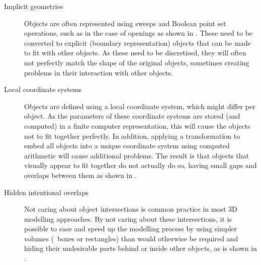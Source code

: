 \begin{description}

\item[Implicit geometries] Objects are often represented using sweeps and Boolean point set operations, such as in the case of openings as shown in .
These need to be converted to explicit (boundary representation) objects that can be made to fit with other objects.
As these need to be discretised, they will often not perfectly match the shape of the original objects, sometimes creating problems in their interaction with other objects.

\item[Local coordinate systems] Objects are defined using a local coordinate system, which might differ per object.
As the parameters of these coordinate systems are stored (and computed) in a finite computer representation, this will cause the objects not to fit together perfectly.
In addition, applying a transformation to embed all objects into a unique coordinate system using computed arithmetic will cause additional problems.
The result is that objects that visually appear to fit together do not actually do so, having small gaps and overlaps between them as shown in .

\item[Hidden intentional overlaps] Not caring about object intersections is common practice in most 3D modelling approaches.
By not caring about these intersections, it is possible to ease and speed up the modelling process by using simpler volumes (\eg\ boxes or rectangles) than would otherwise be required and hiding their undesirable parts behind or inside other objects, as is shown in .

\end{description}

